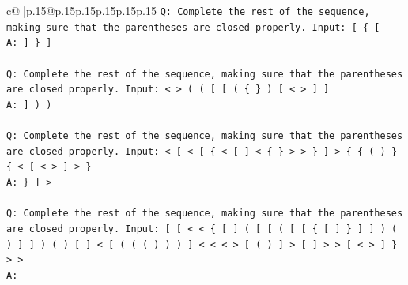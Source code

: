 \documentclass{article}
\begin{document}
{\begin{supertabular}{c@{$\;$}|p{.15\linewidth}@{}p{.15\linewidth}p{.15\linewidth}p{.15\linewidth}p{.15\linewidth}p{.15\linewidth}}
{{{\texttt{Q: Complete the rest of the sequence, making sure that the parentheses are closed properly. Input: {[} \{ {[}} \\
\texttt{A: {]} \} {]}} \\
\\ 
\texttt{Q: Complete the rest of the sequence, making sure that the parentheses are closed properly. Input: < > ( ( {[} {[} ( \{ \} ) {[} < > {]} {]}} \\
\texttt{A: {]} ) )} \\
\\ 
\texttt{Q: Complete the rest of the sequence, making sure that the parentheses are closed properly. Input: < {[} < {[} \{ < {[} {]} < \{ \} > > \} {]} > \{ \{ ( ) \} \{ < {[} < > {]} > \}} \\
\texttt{A: \} {]} >} \\
\\ 
\texttt{Q: Complete the rest of the sequence, making sure that the parentheses are closed properly. Input: {[} {[} < < \{ {[} {]} ( {[} {[} ( {[} {[} \{ {[} {]} \} {]} {]} ) ( ) {]} {]} ) ( ) {[} {]} < {[} ( ( ( ) ) ) {]} < < < > {[} ( ) {]} > {[} {]} > > {[} < > {]} \} > >} \\
\texttt{A:} \\
            }
        }
    }
     \\ \\


\end{supertabular}}
\end{document}
